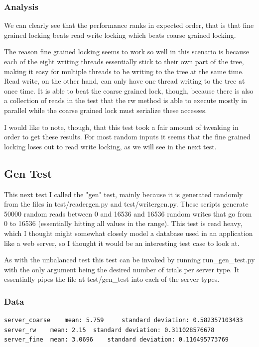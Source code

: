 \documentclass[paper=a4, fontsize=11pt]{scrartcl} %
\numberwithin{equation}{section} %
\numberwithin{figure}{section} %
\numberwithin{table}{section} %
\begin{document}
\subsubsection{Analysis}
We can clearly see that the performance ranks in expected order, that is that fine grained locking beats read write locking which beats coarse grained locking.

The reason fine grained locking seems to work so well in this scenario is because each of the eight writing threads essentially stick to their own part of the tree, making it easy for multiple threads to be writing to the tree at the same time.  Read write, on the other hand, can only have one thread writing to the tree at once time.  It is able to beat the coarse grained lock, though, because there is also a collection of reads in the test that the rw method is able to execute mostly in parallel while the coarse grained lock must serialize these accesses.

I would like to note, though, that this test took a fair amount of tweaking in order to get these results. For most random inputs it seems that the fine grained locking loses out to read write locking, as we will see in the next test. 

\subsection{Gen Test}
This next test I called the "gen" test, mainly because it is generated randomly from the files in test/readergen.py and test/writergen.py.  These scripts generate 50000 random reads between 0 and 16536 and 16536 random writes that go from 0 to 16536 (essentially hitting all values in the range).  This test is read heavy, which I thought might somewhat closely model a database used in an application like a web server, so I thought it would be an interesting test case to look at.

As with the unbalanced test this test can be invoked by running run\_gen\_test.py with the only argument being the desired number of trials per server type. It essentially pipes the file at test/gen\_test into each of the server types.

\subsubsection{Data}
\begin{verbatim}
server_coarse	 mean: 5.759	 standard deviation: 0.582357103433
server_rw	 mean: 2.15	 standard deviation: 0.311028576678
server_fine	 mean: 3.0696	 standard deviation: 0.116495773769
\end{verbatim}
\end{document}
